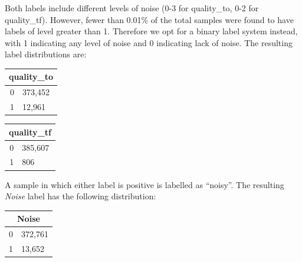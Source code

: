 \documentclass[a4paper,10pt]{article}
\begin{document}
Both labels include different levels of noise (0-3 for quality\_to, 0-2 for quality\_tf). However, fewer than 0.01\% of the total samples were found to have labels of level greater than 1. Therefore we opt for a binary label system instead, with 1 indicating any level of noise and 0 indicating lack of noise. The resulting label distributions are:
\begin{table}[H]
	\parbox{0.45\linewidth}{
		\raggedleft
		\begin{tabular}{r|l}
			\multicolumn{2}{c}{\textbf{quality\_to}} \\\midrule
			0 & 373,452                              \\
			1 & 12,961                               \\
		\end{tabular}
	}
	\hfill
	\parbox{0.45\linewidth}{
		\raggedright
		\begin{tabular}{r|l}
			\multicolumn{2}{c}{\textbf{quality\_tf}} \\\midrule
			0 & 385,607                              \\
			1 & 806                                  \\
		\end{tabular}
	}
\end{table}

A sample in which either label is positive is labelled as ``noisy''. The resulting \emph{Noise} label has the following distribution:
\begin{table}[H]
	\centering
	\begin{tabular}{r|l}
		\multicolumn{2}{c}{\textbf{Noise}} \\\midrule
		0 & 372,761                        \\
		1 & 13,652                         \\
	\end{tabular}
\end{table}
\end{document}
